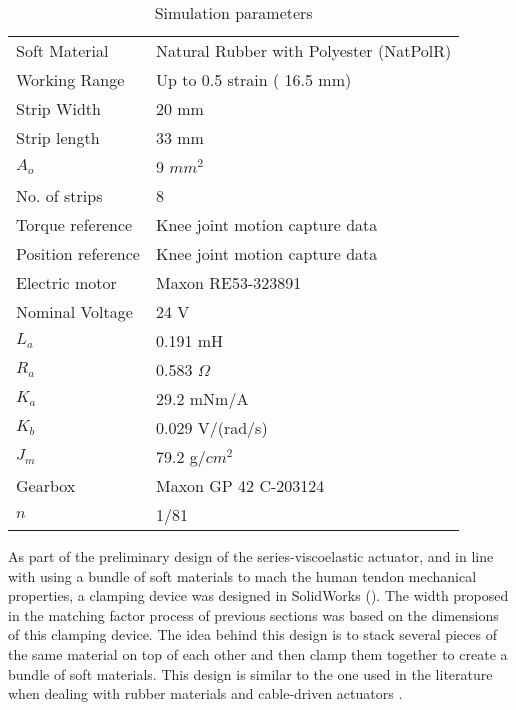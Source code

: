 \begin{table}[hbt!]
    \centering
    \caption{Simulation parameters}
    \begin{tabular}{ll}
    \toprule
    Soft Material       & Natural Rubber with Polyester (NatPolR)\\
    Working Range       & Up to 0.5 strain ( 16.5 mm)\\
    Strip Width        & 20 mm\\
    Strip length       & 33 mm\\
    $A_o$               & 9 $mm^2$\\
    No. of strips      & 8\\ 
    Torque reference    & Knee joint motion capture data \\
    Position reference  & Knee joint motion capture data \\
    \midrule
    Electric motor      & Maxon RE53-323891 \cite{Maxon2019motor}\\
    Nominal Voltage     & 24 V\\
    $L_a$               & 0.191 mH\\
    $R_a$               & 0.583 $\Omega$\\
    $K_a$               & 29.2 mNm/A\\
    $K_b$               & 0.029 V/(rad/s)\\
    $J_m$               & 79.2 g/$cm^2$\\
    \midrule
    Gearbox             & Maxon GP 42 C-203124 \cite{Maxon2019gearhead}\\
    $n$                 & 1/81\\
    \end{tabular}
    \label{tbl:simParameters}
\end{table}

As part of the preliminary design of the series-viscoelastic actuator, and in line with using a bundle of soft materials to mach the human tendon mechanical properties, a clamping device was designed in SolidWorks (). The width proposed in the matching factor process of previous sections was based on the dimensions of this clamping device. The idea behind this design is to stack several pieces of the same material on top of each other and then clamp them together to create a bundle of soft materials. This design is similar to the one used in the literature when dealing with rubber materials and cable-driven actuators \cite{austin2015control}.

